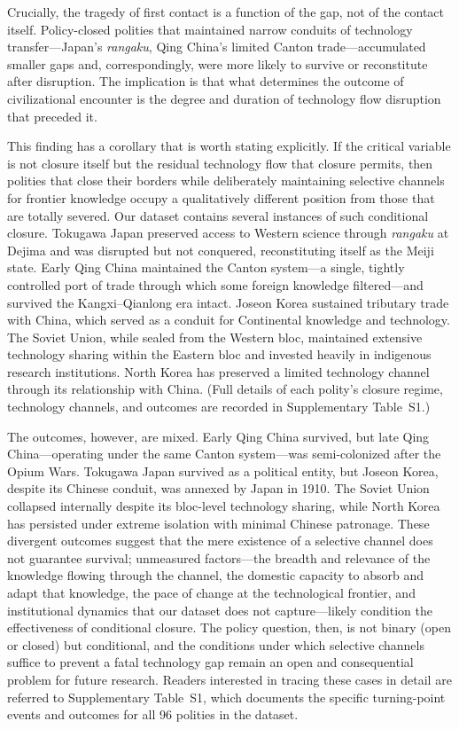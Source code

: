 \documentclass[pdflatex,sn-basic]{sn-jnl}
\theoremstyle{thmstyleone}%
\theoremstyle{thmstyletwo}%
\theoremstyle{thmstylethree}%
\begin{document}
Crucially, the tragedy of first contact is a function of the gap, not of the contact itself. Policy-closed polities that maintained narrow conduits of technology transfer---Japan's \emph{rangaku}, Qing China's limited Canton trade---accumulated smaller gaps and, correspondingly, were more likely to survive or reconstitute after disruption. The implication is that what determines the outcome of civilizational encounter is the degree and duration of technology flow disruption that preceded it.

This finding has a corollary that is worth stating explicitly. If the critical variable is not closure itself but the residual technology flow that closure permits, then polities that close their borders while deliberately maintaining selective channels for frontier knowledge occupy a qualitatively different position from those that are totally severed. Our dataset contains several instances of such conditional closure. Tokugawa Japan preserved access to Western science through \emph{rangaku} at Dejima and was disrupted but not conquered, reconstituting itself as the Meiji state. Early Qing China maintained the Canton system---a single, tightly controlled port of trade through which some foreign knowledge filtered---and survived the Kangxi--Qianlong era intact. Joseon Korea sustained tributary trade with China, which served as a conduit for Continental knowledge and technology. The Soviet Union, while sealed from the Western bloc, maintained extensive technology sharing within the Eastern bloc and invested heavily in indigenous research institutions. North Korea has preserved a limited technology channel through its relationship with China. (Full details of each polity's closure regime, technology channels, and outcomes are recorded in Supplementary Table~S1.)

The outcomes, however, are mixed. Early Qing China survived, but late Qing China---operating under the same Canton system---was semi-colonized after the Opium Wars. Tokugawa Japan survived as a political entity, but Joseon Korea, despite its Chinese conduit, was annexed by Japan in 1910. The Soviet Union collapsed internally despite its bloc-level technology sharing, while North Korea has persisted under extreme isolation with minimal Chinese patronage. These divergent outcomes suggest that the mere existence of a selective channel does not guarantee survival; unmeasured factors---the breadth and relevance of the knowledge flowing through the channel, the domestic capacity to absorb and adapt that knowledge, the pace of change at the technological frontier, and institutional dynamics that our dataset does not capture---likely condition the effectiveness of conditional closure. The policy question, then, is not binary (open or closed) but conditional, and the conditions under which selective channels suffice to prevent a fatal technology gap remain an open and consequential problem for future research. Readers interested in tracing these cases in detail are referred to Supplementary Table~S1, which documents the specific turning-point events and outcomes for all 96 polities in the dataset.
\end{document}
